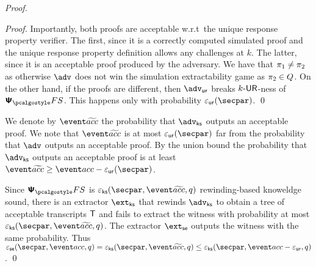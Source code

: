 \begin{proof}
\begin{proof}
	Importantly, both proofs are acceptable w.r.t~the unique response property verifier. The first, since it is a correctly computed simulated proof and the unique response property definition allows any challenges at $k$. The latter, since it is an acceptable proof produced by the adversary.
	We have that $\pi_1 \neq \pi_2$ as otherwise $\advse$ does not win the simulation extractability game as $\pi_2 \in Q$. On the other hand, if the proofs are different, then $\advur$ breaks ${k\text{-}\mathsf{UR}}$-ness of $\psfs$. This happens only with  probability $\epsur(\secpar)$. 
	\qed
	\end{proof}

	We denote by $\waccProb$ the probability that $\advcss$ outputs an acceptable proof. We note that $\waccProb$ is at most $\epsur (\secpar)$ far from the probability that $\advse$ outputs an acceptable proof. By the union bound the probability that $\advcss$ outputs an acceptable proof is at least $\waccProb \geq \accProb - \epsur (\secpar)$. 

	Since $\psfs$ is $\epscss (\secpar, \waccProb,q)$ rewinding-based knoweldge sound, there is an extractor $\extcss$ that rewinds $\advcss$ to obtain a tree of acceptable transcripts $\mathsf{T}$ and fails to extract the witness with probability at most $\epscss (\secpar, \waccProb, q)$. The extractor $\extse$ outputs the witness with the same probability.
%
	Thus $\epsse(\secpar,\accProb,q) = \epscss (\secpar, \waccProb,q) \leq \epscss(\secpar,\accProb - \epsur,q)$.
	\qed
	\end{proof}


